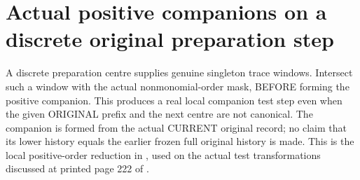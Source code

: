 \section{Actual positive companions on a discrete original preparation step}

A discrete preparation centre supplies genuine singleton trace windows.
Intersect such a window with the actual nonmonomial-order mask, BEFORE
forming the positive companion. This produces a real local companion
test step even when the given ORIGINAL prefix and the next centre are
not canonical. The companion is formed from the actual CURRENT original
record; no claim that its lower history equals the earlier frozen full
original history is made. This is the local positive-order reduction in
\cite[Step II.B]{bierstone-milman08-functoriality}, used on the actual test
transformations discussed at printed page 222 of
\cite{bierstone-milman97-invent-math}.

